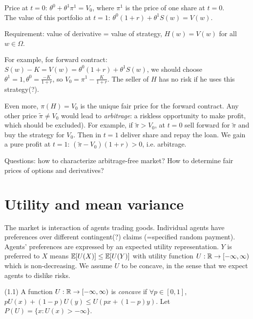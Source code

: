 \documentclass[a4paper]{article}
\begin{document}
Price at $t=0$: $\theta^0+\theta^1 \pi^1 = V_0$, where $\pi^1$ is the price of one share at $t=0$.\\
The value of this portfolio at $t=1$: $\theta^0(1+r) + \theta^1 S(w) = V(w)$.

Requirement: value of derivative = value of strategy, $H(w) = V(w)$ for all $w \in \Omega$.

For example, for forward contract: $S(w)-K = V(w) = \theta^0(1+r)+\theta^1 S(w)$, we should choose $\theta^1 = 1,\theta^0=\frac{-K}{1+r}$, so $V_0 = \pi^1 - \frac{K}{1+r}$. The seller of $H$ has no risk if he uses this strategy(?).

Even more, $\pi(H)=V_0$ is the unique fair price for the forward contract. Any other price $\tilde{\pi} \neq V_0$ would lead to \emph{arbitrage}: a riskless opportunity to make profit, which should be excluded). For example, if $\tilde{\pi} > V_0$, at $t=0$ sell forward for $\tilde{\pi}$ and buy the strategy for $V_0$. Then in $t=1$ deliver share and repay the loan. We gain a pure profit at $t=1$: $(\tilde{\pi}-V_0) (1+r)>0$, i.e. arbitrage.

Questions: how to characterize arbitrage-free market? How to determine fair prices of options and derivatives?

\newpage

\section{Utility and mean variance}

The market is interaction of agents trading goods. Individual agents have preferences over different contingent(?) claims (=specified random payment). Agents' preferences are expressed by an expected utility representation. $Y$ is preferred to $X$ means $\mathbb{E}[U(X)] \leq \mathbb{E}[U(Y)]$ with utility function $U: \mathbb{R} \to [-\infty,\infty)$ which is non-decreasing. We assume $U$ to be concave, in the sense that we expect agents to dislike risks.

\begin{defi} 
(1.1) A function $U:\mathbb{R} \to [-\infty,\infty)$ is \emph{concave} if $\forall p \in [0,1]$, $pU(x) + (1-p) U(y) \leq U(px+(1-p)y)$. Let $P(U) = \{x: U(x)>-\infty\}$.
\end{defi}
\end{document}
